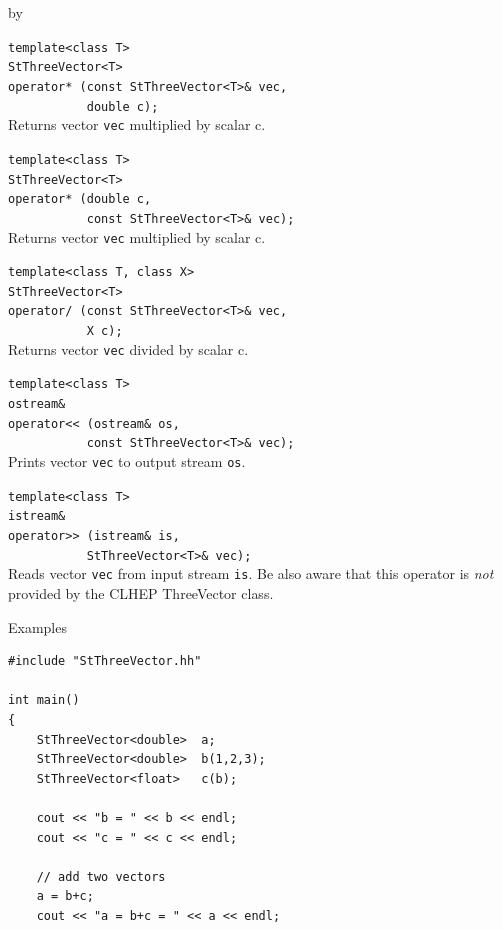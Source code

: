 \documentclass[twoside]{article}
\newcommand{\comp}[1]{\texttt{#1}}%
\newcommand{\entrylabel}[1]{\mbox{\textbf{{#1}}}\hfil}%
\newenvironment{entry}
{\begin{list}{}%
    {\renewcommand{\makelabel}{\entrylabel}%
     \setlength{\labelwidth}{90pt}%
     \setlength{\leftmargin}{\labelwidth}
     \advance\leftmargin by \labelsep%
      }%
    }%
  {\end{list}}
\newcommand{\Entrylabel}[1]%
{\raisebox{0pt}[1ex][0pt]{\makebox[\labelwidth][l]%
    {\parbox[t]{\labelwidth}{\hspace{0pt}\textbf{{#1}}}}}}
\newenvironment{Entry}%
{\renewcommand{\entrylabel}{\Entrylabel}\begin{entry}}%
  {\end{entry}}
\begin{document}
\begin{description}
\begin{Entry}
    \verb+template<class T>+\\
    \verb+StThreeVector<T>+\\
    \verb+operator* (const StThreeVector<T>& vec,+\\
    \verb+           double c);+\\
    Returns vector \comp{vec} multiplied by scalar c.
    
    \verb+template<class T>+\\
    \verb+StThreeVector<T>+\\
    \verb+operator* (double c,+\\
    \verb+           const StThreeVector<T>& vec);+\\
    Returns vector \comp{vec} multiplied by scalar c.
    
    \verb+template<class T, class X>+\\
    \verb+StThreeVector<T>+\\
    \verb+operator/ (const StThreeVector<T>& vec,+\\
    \verb+           X c);+\\
    Returns vector \comp{vec} divided by scalar c.

    \verb+template<class T>+\\
    \verb+ostream&+\\
    \verb+operator<< (ostream& os,+\\
    \verb+           const StThreeVector<T>& vec);+\\
    Prints vector \comp{vec} to output stream \comp{os}.
    
    \verb+template<class T>+\\
    \verb+istream&+\\
    \verb+operator>> (istream& is,+\\
    \verb+           StThreeVector<T>& vec);+\\
    Reads vector \comp{vec} from input stream \comp{is}.
    Be also aware that this operator is {\em not} provided by
    the CLHEP ThreeVector class.

\item[Examples]
{\footnotesize
\begin{verbatim}
#include "StThreeVector.hh"

int main()
{
    StThreeVector<double>  a;
    StThreeVector<double>  b(1,2,3);
    StThreeVector<float>   c(b);

    cout << "b = " << b << endl;
    cout << "c = " << c << endl;

    // add two vectors
    a = b+c;
    cout << "a = b+c = " << a << endl;


\end{verbatim}}
\end{Entry}
\end{description}
\end{document}
